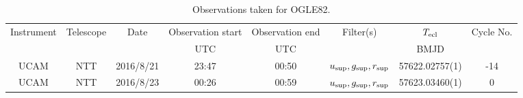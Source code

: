 \begin{table}
	\begin{center}
		\begin{tabular}{cccccccc}
			\hline
			Instrument & Telescope & Date & Observation start & Observation end & Filter(s) & $T_{\rm ecl}$ & Cycle No. \\
			 &  &  & UTC & UTC &  & BMJD &  \\
			\hline
			\hline
			UCAM & NTT & 2016/8/21 & 23:47 & 00:50 & $u_{\rm sup},g_{\rm sup},r_{\rm sup}$ & 57622.02757(1)                                                                                                            &                                         -14 \\
			UCAM & NTT & 2016/8/23 & 00:26 & 00:59 & $u_{\rm sup},g_{\rm sup},r_{\rm sup}$ & 57623.03460(1)                                                                                                            &                                           0 \\
		   \hline
		\end{tabular}
	\end{center}
	\caption{Observations taken for OGLE82.}
	\label{table:observing:observation logs OGLE82}
\end{table}